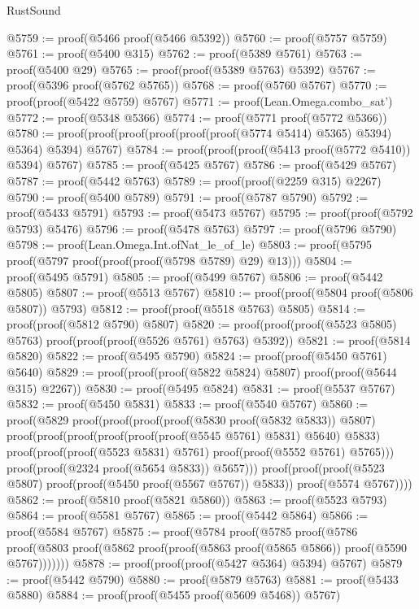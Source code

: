 \begin{lexlean}{RustSound}
\begin{coremodule}
@5759 := proof(@5466 proof(@5466 @5392))
@5760 := proof(@5757 @5759)
@5761 := proof(@5400 @315)
@5762 := proof(@5389 @5761)
@5763 := proof(@5400 @29)
@5765 := proof(proof(@5389 @5763) @5392)
@5767 := proof(@5396 proof(@5762 @5765))
@5768 := proof(@5760 @5767)
@5770 := proof(proof(@5422 @5759) @5767)
@5771 := proof(Lean.Omega.combo_sat')
@5772 := proof(@5348 @5366)
@5774 := proof(@5771 proof(@5772 @5366))
@5780 := proof(proof(proof(proof(proof(proof(@5774 @5414) @5365) @5394) @5364) @5394) @5767)
@5784 := proof(proof(proof(@5413 proof(@5772 @5410)) @5394) @5767)
@5785 := proof(@5425 @5767)
@5786 := proof(@5429 @5767)
@5787 := proof(@5442 @5763)
@5789 := proof(proof(@2259 @315) @2267)
@5790 := proof(@5400 @5789)
@5791 := proof(@5787 @5790)
@5792 := proof(@5433 @5791)
@5793 := proof(@5473 @5767)
@5795 := proof(proof(@5792 @5793) @5476)
@5796 := proof(@5478 @5763)
@5797 := proof(@5796 @5790)
@5798 := proof(Lean.Omega.Int.ofNat_le_of_le)
@5803 := proof(@5795 proof(@5797 proof(proof(proof(@5798 @5789) @29) @13)))
@5804 := proof(@5495 @5791)
@5805 := proof(@5499 @5767)
@5806 := proof(@5442 @5805)
@5807 := proof(@5513 @5767)
@5810 := proof(proof(@5804 proof(@5806 @5807)) @5793)
@5812 := proof(proof(@5518 @5763) @5805)
@5814 := proof(proof(@5812 @5790) @5807)
@5820 := proof(proof(proof(@5523 @5805) @5763) proof(proof(proof(@5526 @5761) @5763) @5392))
@5821 := proof(@5814 @5820)
@5822 := proof(@5495 @5790)
@5824 := proof(proof(@5450 @5761) @5640)
@5829 := proof(proof(proof(@5822 @5824) @5807) proof(proof(@5644 @315) @2267))
@5830 := proof(@5495 @5824)
@5831 := proof(@5537 @5767)
@5832 := proof(@5450 @5831)
@5833 := proof(@5540 @5767)
@5860 := proof(@5829
      proof(proof(proof(proof(@5830 proof(@5832 @5833)) @5807)
            proof(proof(proof(proof(proof(proof(@5545 @5761) @5831) @5640) @5833)
                  proof(proof(proof(@5523 @5831) @5761) proof(proof(@5552 @5761) @5765)))
                proof(proof(@2324 proof(@5654 @5833)) @5657)))
          proof(proof(proof(@5523 @5807) proof(proof(@5450 proof(@5567 @5767)) @5833))
              proof(@5574 @5767))))
@5862 := proof(@5810 proof(@5821 @5860))
@5863 := proof(@5523 @5793)
@5864 := proof(@5581 @5767)
@5865 := proof(@5442 @5864)
@5866 := proof(@5584 @5767)
@5875 := proof(@5784
      proof(@5785
          proof(@5786
              proof(@5803 proof(@5862 proof(proof(@5863 proof(@5865 @5866)) proof(@5590 @5767)))))))
@5878 := proof(proof(proof(@5427 @5364) @5394) @5767)
@5879 := proof(@5442 @5790)
@5880 := proof(@5879 @5763)
@5881 := proof(@5433 @5880)
@5884 := proof(proof(@5455 proof(@5609 @5468)) @5767)

\end{coremodule}
\end{lexlean}
